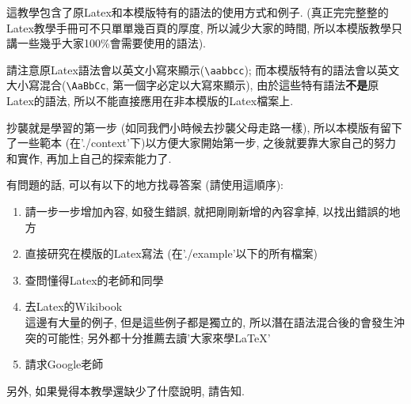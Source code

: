 

這教學包含了原Latex和本模版特有的語法的使用方式和例子. (真正完完整整的Latex教學手冊可不只單單幾百頁的厚度, 所以減少大家的時間, 所以本模版教學只講一些幾乎大家100\%會需要使用的語法). 

請注意原Latex語法會以英文小寫來顯示(\verb|\aabbcc|); 而本模版特有的語法會以英文大小寫混合(\verb|\AaBbCc|, 第一個字必定以大寫來顯示), 由於這些特有語法\textbf{不是}原Latex的語法, 所以不能直接應用在非本模版的Latex檔案上.

抄襲就是學習的第一步 (如同我們小時候去抄襲父母走路一樣), 所以本模版有留下了一些範本 (在'./context'下)以方便大家開始第一步, 之後就要靠大家自己的努力和實作, 再加上自己的探索能力了.

有問題的話, 可以有以下的地方找尋答案 (請使用這順序):
\begin{enumerate}
  \item 請一步一步增加內容, 如發生錯誤, 就把剛剛新增的內容拿掉, 以找出錯誤的地方
  \item 直接研究在模版的Latex寫法 (在'./example'以下的所有檔案)
  \item 查問懂得Latex的老師和同學
  \item 去Latex的Wikibook\\
        這邊有大量的例子, 但是這些例子都是獨立的, 所以潛在語法混合後的會發生沖突的可能性; 另外都十分推薦去讀'大家來學LaTeX' 
  \item 請求Google老師
\end{enumerate}

另外, 如果覺得本教學還缺少了什麼說明, 請告知.


\newpage
\newpage
\newpage
\newpage
\newpage
\newpage
\newpage

\EndChapter
